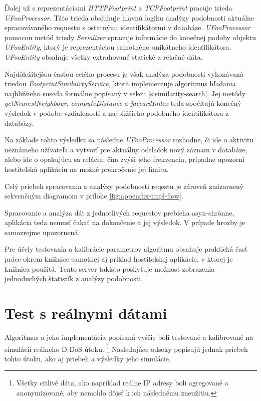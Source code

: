 \documentclass[
  digital, %
  table,   %
  lof,     %
  nolot,   %
  nocover
]{fithesis3}
\begin{document}
Ďalej už s reprezentáciami \textit{HTTPFootprint} a \textit{TCPFootprint}
pracuje trieda \textit{UFooProcessor}. Táto trieda obsluhuje hlavnú logiku
analýzy podobnosti aktuálne spracovávaného requestu s ostatnými identifikátormi
v databáze. \textit{UFooProcessor} pomocou metód triedy \textit{Serializer} spracuje informácie do
konečnej podoby objektu \textit{UFooEntity}, ktorý je reprezentáciou samotného
unikátneho identifikátora. \textit{UFooEntity} obsahuje všetky extrahované
statické a relačné dáta.

Najdôležitejšou časťou celého procesu je však analýza podobnosti vykonávaná triedou
\textit{FootprintSimilairtyService}, ktorá implementuje algoritmus hľadania
najbližšieho suseda formálne popísaný v sekcii \ref{s:similarity-search}. Jej
metódy \textit{getNearestNeighbour},  \textit{computeDistance} a
\textit{jaccardIndex} teda spočítajú konečný výsledok v podobe vzdialenosti a
najbližšieho podobného identifikátora z databázy.

Na základe tohto výsledku sa následne \textit{UFooProcessor} rozhodne, či ide o
aktivitu neznámeho užívateľa a vytvorí pre aktuálny odtlačok nový záznam v
databáze, alebo ide o opakujúcu sa reláciu, čím zvýši jeho frekvenciu, prípadne
upozorní hostiteľskú aplikáciu na možné prekročenie jej limitu.

Celý priebeh spracovania a analýzy podobnosti reqestu je zároveň znázornený
sekvenčným diagramom v prílohe \ref{fig:appendix-impl-flow}.

Spracovanie a analýza dát z jednotlivých requestov prebieha asyn-chrónne,
aplikácia teda nemusí čakať na dokončenie a jej výsledok. V prípade hrozby je
samozrejme upozornená. 

Pre účely testovania a kalibrácie parametrov algoritmu obsahuje praktická časť práce okrem
knižnice samotnej aj príklad hostiteľskej aplikácie, v ktorej je knižnica
použitá. Tento server takisto poskytuje možnosť zobrazenia jednoduchých
štatistík z analýzy podobnosti.

\chapter{Test s reálnymi dátami}
\label{ch:data}
Algoritmus a jeho implementácia popísaná vyššie boli testované a kalibrované na
simulácií reálneho D-DoS útoku. \footnote{Všetky citlivé dáta, ako napríklad reálne IP
adresy boli agregované a anonymizované, aby nemohlo dôjsť k ich následnému
zneužitiu.} Nasledujúce odseky popisujú jednak priebeh tohto
útoku, ako aj priebeh a výsledky jeho simulácie. 
\end{document}
